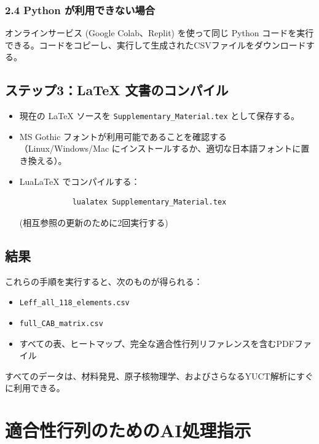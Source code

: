 \documentclass[12pt,a4paper]{article}
\begin{document}
	\subsubsection{2.4 Python が利用できない場合}
	オンラインサービス (Google Colab、Replit) を使って同じ Python コードを実行できる。コードをコピーし、実行して生成されたCSVファイルをダウンロードする。
	
	\subsection{ステップ3：LaTeX 文書のコンパイル}
	\begin{itemize}
		\item 現在の LaTeX ソースを \texttt{Supplementary\_Material.tex} として保存する。
		\item MS Gothic フォントが利用可能であることを確認する（Linux/Windows/Mac にインストールするか、適切な日本語フォントに置き換える）。
		\item LuaLaTeX でコンパイルする：
		\begin{verbatim}
			lualatex Supplementary_Material.tex
		\end{verbatim}
		(相互参照の更新のために2回実行する)
	\end{itemize}
	
	\subsection{結果}
	これらの手順を実行すると、次のものが得られる：
	\begin{itemize}
		\item \texttt{Leff\_all\_118\_elements.csv}
		\item \texttt{full\_CAB\_matrix.csv}
		\item すべての表、ヒートマップ、完全な適合性行列リファレンスを含むPDFファイル
	\end{itemize}
	すべてのデータは、材料発見、原子核物理学、およびさらなるYUCT解析にすぐに利用できる。
	
	\section{適合性行列のためのAI処理指示}
	\label{sec:ai_instructions}
	
\end{document}
